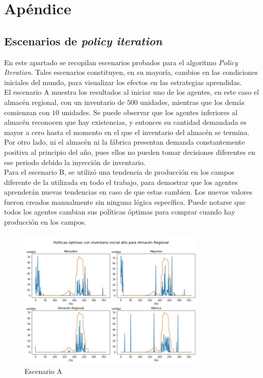 \chapter{Ap\'endice}

\section{Escenarios de \textit{policy iteration}}

En este apartado se recopilan escenarios probados para el algoritmo \textit{Policy Iteration}. Tales escenarios constituyen, en su mayor\'ia, cambios en las condiciones iniciales del mundo, para visualizar los efectos en las estrategias aprendidas.\\

El escenario A muestra los resultados al iniciar uno de los agentes, en este caso el almac\'en regional, con un inventario de $500$ unidades, mientras que los dem\'as comienzan con $10$ unidades. Se puede observar que los agentes inferiores al almac\'en reconocen que hay existencias, y entonces su cantidad demandada es mayor a cero hasta el momento en el que el inventario del almac\'en se termina. Por otro lado, ni el almac\'en ni la f\'abrica presentan demanda constantemente positiva al principio del a\~no, pues ellos no pueden tomar decisiones diferentes en ese periodo debido la inyecci\'on de inventario.\\

Para el escenario B, se utiliz\'o una tendencia de producci\'on en los campos diferente de la utilizada en todo el trabajo, para demostrar que los agentes aprender\'an nuevas tendencias en caso de que estas cambien. Los nuevos valores fueron creados manualmente sin ninguna l\'ogica espec\'ifica. Puede notarse que todos los agentes cambian sus pol\'iticas \'optimas para comprar cuando hay producci\'on en los campos. \\

\begin{figure}[H]
\caption{Escenario A}
\label{scen_wholesale_500}
\includegraphics[width=9cm]{tesis_tex/figs/policyiteration_scen_wholesale500.png}
\centering
\end{figure}

